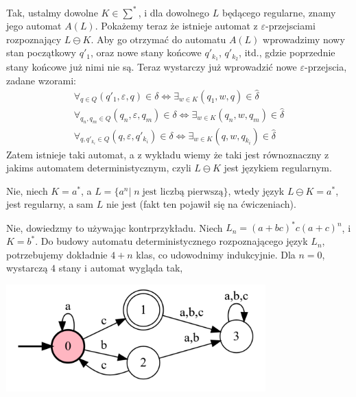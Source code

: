 \documentclass[11pt]{scrartcl}
\begin{document}
    \begin{walk}
    \item Tak, ustalmy dowolne $K \in \sum^*$, i dla dowolnego $L$ będącego regularne,  znamy jego automat $A(L)$. Pokażemy teraz że istnieje automat z $\varepsilon$-przejsciami rozpoznający $L \ominus K$. Aby go otrzymać do automatu $A(L)$ wprowadzimy nowy stan początkowy $q'_1$, oraz nowe stany końcowe $q'_{k_1}$, $q'_{k_2}$, itd., gdzie poprzednie stany końcowe już nimi nie są. Teraz wystarczy już wprowadzić nowe $\varepsilon$-przejscia, zadane wzorami:
      \begin{gather*}
        \forall_{q \in Q}\left ( q'_1, \varepsilon, q \right ) \in \delta \iff \exists_{w \in K} \left ( q_1, w, q \right ) \in \widehat{\delta} \\
      \forall_{q_n, q_m \in Q}\left ( q_n, \varepsilon, q_m \right ) \in \delta \iff \exists_{w \in K} \left ( q_n, w, q_m \right ) \in \widehat{\delta} \\
        \forall_{q, q'_{k_i} \in Q} \left ( q, \varepsilon, q'_{k_i} \right ) \in \delta \iff  \exists_{w \in K} \left ( q, w, q_{k_i} \right ) \in \widehat{\delta}
      \end{gather*}
     Zatem istnieje taki automat, a z wykładu wiemy że taki jest równoznaczny z jakims automatem deterministycznym, czyli $L \ominus K$ jest językiem regularnym.
        \item Nie, niech $K = a^*$, a $L = \{a^n | \; n \; \text{jest liczbą pierwszą} \}$, wtedy język $L \ominus K = a^*$, jest regularny, a sam $L$ nie jest (fakt ten pojawił się na ćwiczeniach).
        \item Nie, dowiedzmy to używając kontrprzykładu. Niech $L_n = (a + bc)^* c (a+c)^n$, i $K = b^*$. Do budowy automatu deterministycznego rozpoznającego język $L_n$, potrzebujemy dokładnie $4 + n$ klas, co udowodnimy indukcyjnie. Dla $n = 0$, wystarczą $4$ stany i automat wygląda tak,
          \begin{center}
            \includegraphics[width=10cm]{automat}
          \end{center}
          


\end{walk}
\end{document}
